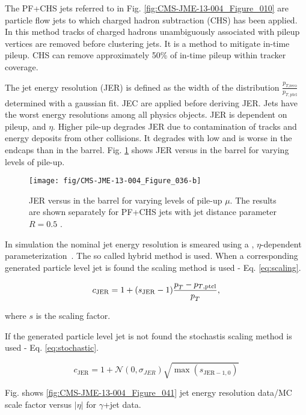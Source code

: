 \begin{description}
The PF+CHS jets referred to in Fig. \ref{fig:CMS-JME-13-004_Figure_010} are particle flow jets to which charged hadron subtraction (CHS) has been applied. In this method tracks of charged hadrons unambiguously associated with pileup vertices are removed before clustering jets. It is a method to mitigate in-time pileup. CHS can remove approximately 50\% of in-time pileup within tracker coverage.

The jet energy resolution (JER) is defined as the width of the distribution $\frac{p_{T\text{,reco}}}{p_{T,\text{ptcl}}}$ determined with a gaussian fit. JEC are applied before deriving JER. Jets have the worst energy resolutions among all physics objects. JER is dependent on pileup, \pt and $\eta$. Higher pile-up degrades JER due to contamination of tracks and energy deposits from other collisions. It degrades with low \pt and is worse in the endcaps than in the barrel. Fig. \ref{fig:JER} shows JER versus \pt in the barrel for varying levels of pile-up.

\begin{figure}[htp]
\centering
  \def\twidth{0.45}
  \centering
    \texttt{[image: fig/CMS-JME-13-004\_Figure\_036-b]}
\caption{JER versus \pt in the barrel for varying levels of pile-up $\mu$. The results are shown separately for PF+CHS jets with jet distance parameter $R=0.5$ \cite{Khachatryan:2016kdb}.}
\label{fig:JER}
\end{figure}

In simulation the nominal jet energy resolution is smeared using a \pt, $\eta$-dependent parameterization~\cite{twiki:JER}. The so called hybrid method is used. When a corresponding generated particle level jet is found the scaling method is used - Eq. \ref{eq:scaling}.

\begin{equation}
c_{\text{JER}}=1 + (s_{\text{JER}}-1)\frac{p_{T}^{}-p_{T\text{,ptcl}}}{p_{T}^{}},
\label{eq:scaling}
\end{equation}

where $s$ is the scaling factor.

If the generated particle level jet is not found the stochastis scaling method is used - Eq. \ref{eq:stochastic}.

\begin{equation}
c_{\text{JER}}=1+\mathcal{N}(0,\sigma_{JER})\sqrt{\max(s_{\text{JER}-1,0})}
\label{eq:stochastic}
\end{equation}

Fig. shows \ref{fig:CMS-JME-13-004_Figure_041} jet energy resolution data/MC scale factor versus $\left|\eta\right|$ for $\gamma$+jet data.


\end{description}
